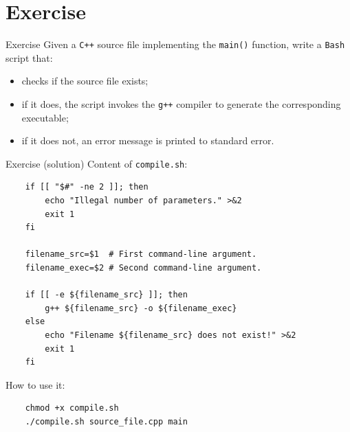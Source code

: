 \documentclass{beamer}
\begin{document}
\section{Exercise}
\begin{frame}{Exercise}
Given a \texttt{C++} source file implementing the \texttt{main()} function, write a \texttt{Bash} script that:
\begin{itemize}
\item checks if the source file exists;
\item if it does, the script invokes the \texttt{g++} compiler to generate the corresponding executable;
\item if it does not, an error message is printed to standard error.
\end{itemize}
\end{frame}

\begin{frame}[fragile]{Exercise (solution)}
Content of \texttt{compile.sh}:
\begin{lstlisting}
    if [[ "$#" -ne 2 ]]; then
        echo "Illegal number of parameters." >&2
        exit 1
    fi
    
    filename_src=$1  # First command-line argument.
    filename_exec=$2 # Second command-line argument.
    
    if [[ -e ${filename_src} ]]; then
        g++ ${filename_src} -o ${filename_exec}
    else
        echo "Filename ${filename_src} does not exist!" >&2
        exit 1
    fi
\end{lstlisting}
\vfill
How to use it:
\begin{lstlisting}
    chmod +x compile.sh
    ./compile.sh source_file.cpp main
\end{lstlisting}
\end{frame}
\end{document}
